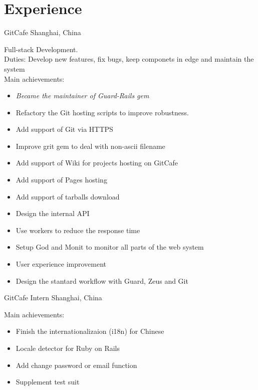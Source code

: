\documentclass[]{friggeri-cv} %
\begin{document}

\section{Experience}

\begin{entrylist}
  {GitCafe}
  {Shanghai, China}
  {
    Full-stack Development.\\
    Duties: Develop new features, fix bugs, keep componets in edge and
    maintain the system\\
    Main achievements:
    \begin{itemize}
    \item \emph{Became the maintainer of Guard-Rails gem}
    \item Refactory the Git hosting scripts to improve robustness.
    \item Add support of Git via HTTPS
    \item Improve grit gem to deal with non-ascii filename
    \item Add support of Wiki for projects hosting on GitCafe
    \item Add support of Pages hosting
    \item Add support of tarballs download
    \item Design the internal API
    \item Use workers to reduce the response time
    \item Setup God and Monit to monitor all parts of the web system
    \item User experience improvement
    \item Design the stantard workflow with Guard, Zeus and Git
    \end{itemize}
  }
  {GitCafe \textnormal{Intern}}
  {Shanghai, China}
  {
    Main achievements:
    \begin{itemize}
    \item Finish the internationalizaion (i18n) for Chinese
    \item Locale detector for Ruby on Rails
    \item Add change password or email function
    \item Supplement test suit
    \end{itemize}
  }
\end{entrylist}
\end{document}
